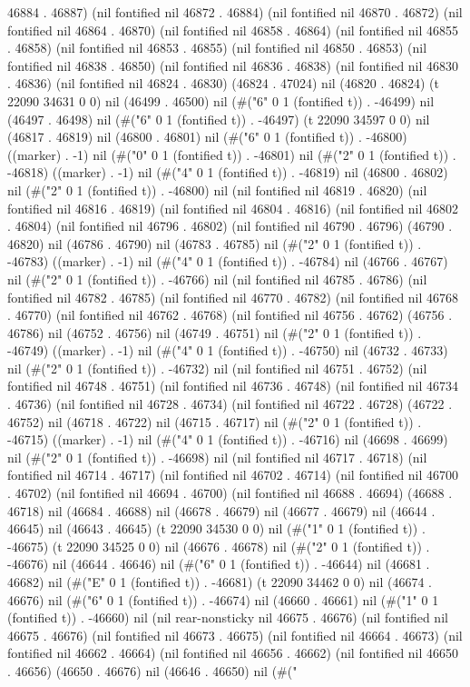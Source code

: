 46884 . 46887) (nil fontified nil 46872 . 46884) (nil fontified nil 46870 . 46872) (nil fontified nil 46864 . 46870) (nil fontified nil 46858 . 46864) (nil fontified nil 46855 . 46858) (nil fontified nil 46853 . 46855) (nil fontified nil 46850 . 46853) (nil fontified nil 46838 . 46850) (nil fontified nil 46836 . 46838) (nil fontified nil 46830 . 46836) (nil fontified nil 46824 . 46830) (46824 . 47024) nil (46820 . 46824) (t 22090 34631 0 0) nil (46499 . 46500) nil (#("6" 0 1 (fontified t)) . -46499) nil (46497 . 46498) nil (#("6" 0 1 (fontified t)) . -46497) (t 22090 34597 0 0) nil (46817 . 46819) nil (46800 . 46801) nil (#("6" 0 1 (fontified t)) . -46800) ((marker) . -1) nil (#("0" 0 1 (fontified t)) . -46801) nil (#("2" 0 1 (fontified t)) . -46818) ((marker) . -1) nil (#("4" 0 1 (fontified t)) . -46819) nil (46800 . 46802) nil (#("2" 0 1 (fontified t)) . -46800) nil (nil fontified nil 46819 . 46820) (nil fontified nil 46816 . 46819) (nil fontified nil 46804 . 46816) (nil fontified nil 46802 . 46804) (nil fontified nil 46796 . 46802) (nil fontified nil 46790 . 46796) (46790 . 46820) nil (46786 . 46790) nil (46783 . 46785) nil (#("2" 0 1 (fontified t)) . -46783) ((marker) . -1) nil (#("4" 0 1 (fontified t)) . -46784) nil (46766 . 46767) nil (#("2" 0 1 (fontified t)) . -46766) nil (nil fontified nil 46785 . 46786) (nil fontified nil 46782 . 46785) (nil fontified nil 46770 . 46782) (nil fontified nil 46768 . 46770) (nil fontified nil 46762 . 46768) (nil fontified nil 46756 . 46762) (46756 . 46786) nil (46752 . 46756) nil (46749 . 46751) nil (#("2" 0 1 (fontified t)) . -46749) ((marker) . -1) nil (#("4" 0 1 (fontified t)) . -46750) nil (46732 . 46733) nil (#("2" 0 1 (fontified t)) . -46732) nil (nil fontified nil 46751 . 46752) (nil fontified nil 46748 . 46751) (nil fontified nil 46736 . 46748) (nil fontified nil 46734 . 46736) (nil fontified nil 46728 . 46734) (nil fontified nil 46722 . 46728) (46722 . 46752) nil (46718 . 46722) nil (46715 . 46717) nil (#("2" 0 1 (fontified t)) . -46715) ((marker) . -1) nil (#("4" 0 1 (fontified t)) . -46716) nil (46698 . 46699) nil (#("2" 0 1 (fontified t)) . -46698) nil (nil fontified nil 46717 . 46718) (nil fontified nil 46714 . 46717) (nil fontified nil 46702 . 46714) (nil fontified nil 46700 . 46702) (nil fontified nil 46694 . 46700) (nil fontified nil 46688 . 46694) (46688 . 46718) nil (46684 . 46688) nil (46678 . 46679) nil (46677 . 46679) nil (46644 . 46645) nil (46643 . 46645) (t 22090 34530 0 0) nil (#("1" 0 1 (fontified t)) . -46675) (t 22090 34525 0 0) nil (46676 . 46678) nil (#("2" 0 1 (fontified t)) . -46676) nil (46644 . 46646) nil (#("6" 0 1 (fontified t)) . -46644) nil (46681 . 46682) nil (#("E" 0 1 (fontified t)) . -46681) (t 22090 34462 0 0) nil (46674 . 46676) nil (#("6" 0 1 (fontified t)) . -46674) nil (46660 . 46661) nil (#("1" 0 1 (fontified t)) . -46660) nil (nil rear-nonsticky nil 46675 . 46676) (nil fontified nil 46675 . 46676) (nil fontified nil 46673 . 46675) (nil fontified nil 46664 . 46673) (nil fontified nil 46662 . 46664) (nil fontified nil 46656 . 46662) (nil fontified nil 46650 . 46656) (46650 . 46676) nil (46646 . 46650) nil (#("
